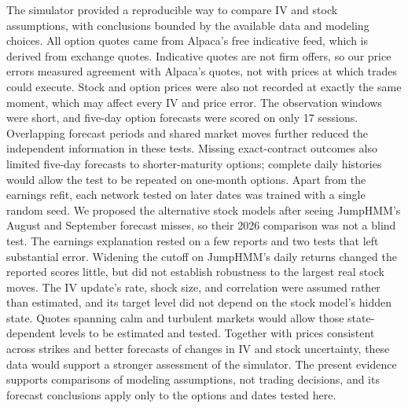 The simulator provided a reproducible way to compare IV and stock assumptions, with conclusions bounded by the available data and modeling choices. All option quotes came from Alpaca's free indicative feed, which is derived from exchange quotes. Indicative quotes are not firm offers, so our price errors measured agreement with Alpaca's quotes, not with prices at which trades could execute. Stock and option prices were also not recorded at exactly the same moment, which may affect every IV and price error. The observation windows were short, and five-day option forecasts were scored on only 17 sessions. Overlapping forecast periods and shared market moves further reduced the independent information in these tests. Missing exact-contract outcomes also limited five-day forecasts to shorter-maturity options; complete daily histories would allow the test to be repeated on one-month options. Apart from the earnings refit, each network tested on later dates was trained with a single random seed. We proposed the alternative stock models after seeing JumpHMM's August and September forecast misses, so their 2026 comparison was not a blind test. The earnings explanation rested on a few reports and two tests that left substantial error. Widening the cutoff on JumpHMM's daily returns changed the reported scores little, but did not establish robustness to the largest real stock moves. The IV update's rate, shock size, and correlation were assumed rather than estimated, and its target level did not depend on the stock model's hidden state. Quotes spanning calm and turbulent markets would allow those state-dependent levels to be estimated and tested. Together with prices consistent across strikes and better forecasts of changes in IV and stock uncertainty, these data would support a stronger assessment of the simulator. The present evidence supports comparisons of modeling assumptions, not trading decisions, and its forecast conclusions apply only to the options and dates tested here.
